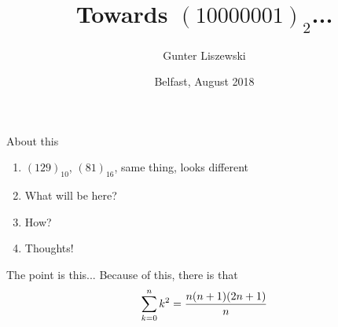 \documentclass[pdf]{beamer}
\title{Towards $(10000001)_2$...}
\author{Gunter Liszewski}
\date{Belfast, August 2018}
\begin{document}
\begin{frame}
  \titlepage
\end{frame}


\begin{frame}{About this}

  \begin{enumerate}[0]
    \pause
    \item $(129)_{10}$, $(81)_{16}$, same thing, looks different
    \pause
    \item What will be here?
    \pause
    \item How?
    \pause
    \item Thoughts!
  \end{enumerate}
\end{frame}

\begin{frame}{The point is this...}
  Because of this, there is that
$$\sum_{k=0}^{n}{k^2}={n(n+1)(2n+1)\over n}$$
\end{frame}
\end{document}
